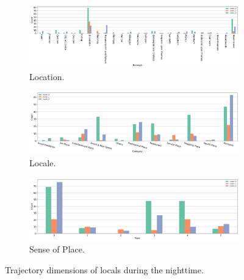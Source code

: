 \documentclass{article}
\theoremstyle{definition}
\theoremstyle{remark}
\begin{document}
\begin{figure}[!h]

\centering
\begin{subfigure}{0.6\textheight}
\centering
\includegraphics[width=1\linewidth]{figures/traj_location_nighttime_locals.png}
\caption{Location.}
\label{fig:traj_location_nighttime_locals}
\end{subfigure}
\begin{subfigure}{0.6\textheight}
\centering
\includegraphics[width=1\linewidth]{figures/traj_locale_nighttime_locals.png}
\caption{Locale.}
\label{fig:traj_locale_nighttime_locals}
\end{subfigure}
\begin{subfigure}{0.6\textheight}
\centering
\includegraphics[width=1\linewidth]{figures/traj_sense_nighttime_locals.png}
\caption{Sense of Place.}
\label{fig:traj_sense_nighttime_locals}
\end{subfigure}

\caption{Trajectory dimensions of locals during the nighttime.}
\label{fig:traj_dimension_nighttime_locas}
\end{figure}
\end{document}
